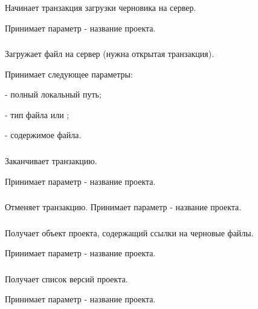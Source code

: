 Начинает транзакция загрузки черновика на сервер.

Принимает параметр  - название проекта.

\subsubsection{}

Загружает файл на сервер (нужна открытая транзакция). 

Принимает следующее параметры:

\begin{icItems}
	\item {} - полный локальный путь;
	\item {} - тип файла  или ;
	\item {} - содержимое файла.
\end{icItems}

\subsubsection{}

Заканчивает транзакцию.

Принимает параметр  - название проекта.

\subsubsection{}

Отменяет транзакцию. Принимает параметр  - название проекта.

\subsubsection{}

Получает объект проекта, содержащий ссылки на черновые файлы. 

Принимает параметр  - название проекта.

\subsubsection{}

Получает список версий проекта.

Принимает параметр  - название проекта.

